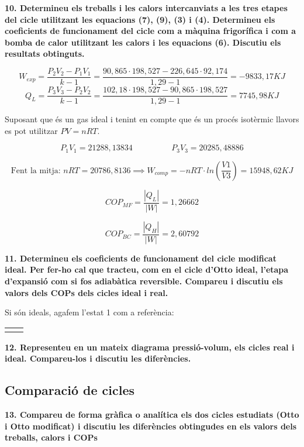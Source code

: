 \documentclass[a4paper]{article}
\begin{document}
\textbf{10. Determineu els treballs i les calors intercanviats a les tres etapes del cicle utilitzant les equacions (7), (9), (3) i (4). Determineu els coeficients de funcionament del cicle com a màquina frigorífica i com a bomba de calor utilitzant les calors i les equacions (6). Discutiu els resultats obtinguts.}

$$ W_{exp} = \frac{P_2 V_2 - P_1 V_1}{k - 1} = 
\frac{90,865·198,527 - 226,645·92,174}{1,29 - 1} = \boxed{-9833,17 KJ} $$
$$ Q_L = \frac{P_3 V_3 - P_2 V_2}{k - 1} = 
\frac{102,18·198,527 - 90,865·198,527}{1,29-1} = \boxed{7745,98 KJ} $$

Suposant que és un gas ideal i tenint en compte que és un procés isotèrmic llavors es pot utilitzar $ PV = nRT$.

$$ P_1 V_1 = 21288,13834 \hspace{2cm} P_3 V_3 = 20285,48886 $$

$$ \text{Fent la mitja: } nRT = 20786,8136 \implies W_{comp} = -nRT·ln\left(\frac{V1}{V3}\right) = \boxed{15948,62 KJ} $$

$$ COP_{MF} = \frac{|Q_L|}{|W|} = \boxed{1,26662} $$

$$ COP_{BC} = \frac{|Q_H|}{|W|} = \boxed{2,60792} $$

\textbf{11. Determineu els coeficients de funcionament del cicle modificat ideal. Per fer-ho cal que tracteu, com en el cicle d'Otto ideal, l'etapa d'expansió com si fos adiabàtica reversible. Compareu i discutiu els valors dels COPs dels cicles ideal i real.}

Si són ideals, agafem l'estat 1 com a referència:

\begin{center}
	\begin{tabular}{cl}
		& 
	\end{tabular}
\end{center}

\textbf{12. Representeu en un mateix diagrama pressió-volum, els cicles real i ideal. Compareu-los i discutiu les diferències.}

\subsection*{Comparació de cicles}	

\textbf{13. Compareu de forma gràfica o analítica els dos cicles estudiats (Otto i Otto modificat) i discutiu les diferències obtingudes en els valors dels treballs, calors i COPs}
\end{document}
